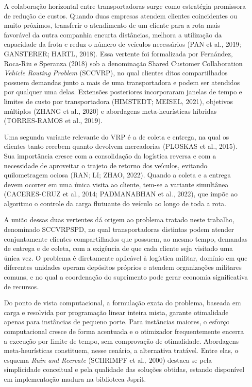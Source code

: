 \documentclass[a4paper,12pt]{article}
\begin{document}
A colaboração horizontal entre transportadoras surge como estratégia promissora de redução de custos. Quando duas empresas atendem clientes coincidentes ou muito próximos, transferir o atendimento de um cliente para a rota mais favorável da outra companhia encurta distâncias, melhora a utilização da capacidade da frota e reduz o número de veículos necessários (PAN et al., 2019; GANSTERER; HARTL, 2018). Essa vertente foi formalizada por Fernández, Roca-Riu e Speranza (2018) sob a denominação Shared Customer Collaboration \textit{Vehicle Routing Problem} (SCCVRP), no qual clientes ditos compartilhados possuem demandas junto a mais de uma transportadora e podem ser atendidos por qualquer uma delas. Extensões posteriores incorporaram janelas de tempo e limites de custo por transportadora (HIMSTEDT; MEISEL, 2021), objetivos múltiplos (ZHANG et al., 2020) e abordagens meta-heurísticas híbridas (TORRES-RAMOS et al., 2019).

Uma segunda variante relevante do VRP é a de coleta e entrega, na qual os clientes tanto recebem quanto devolvem mercadorias (PLOSKAS et al., 2015). Sua importância cresce com a consolidação da logística reversa e com a necessidade de aproveitar o trajeto de retorno dos veículos, evitando quilometragem ociosa (RAN; LI; ZHAO, 2022). Quando a coleta e a entrega devem ocorrer em uma única visita ao cliente, tem-se a variante simultânea (CACERES-CRUZ et al., 2014; PADMANABHAN et al., 2022), que impõe ao algoritmo o controle da carga flutuante do veículo ao longo de toda a rota.

A união dessas duas vertentes dá origem ao problema tratado neste trabalho, denominado SCCVRPSPD, no qual transportadoras distintas podem atender conjuntamente clientes compartilhados que possuem, ao mesmo tempo, demandas de entrega e de coleta, com a exigência de que cada cliente seja visitado uma única vez. O problema é diretamente aplicável à logística militar, domínio em que diferentes unidades operam depósitos próprios e atendem organizações militares comuns, e no qual a coordenação do suprimento pode gerar economia significativa de recursos.

Do ponto de vista computacional, a formulação exata do problema, baseada em carga e resolvida por programação linear inteira mista, garante otimalidade apenas para instâncias de pequeno porte. Para instâncias maiores, o esforço computacional cresce de forma acentuada e o otimizador frequentemente encerra a execução por limite de tempo, sem comprovação de otimalidade. Abordagens meta-heurísticas constituem, nesse cenário, a alternativa tratável. Entre elas, o esquema \textit{Ruin-and-Recreate} (SCHRIMPF et al., 2000) destaca-se pela simplicidade conceitual e pela qualidade das soluções obtidas, estando disponível em implementação madura na biblioteca Jsprit.
\end{document}

